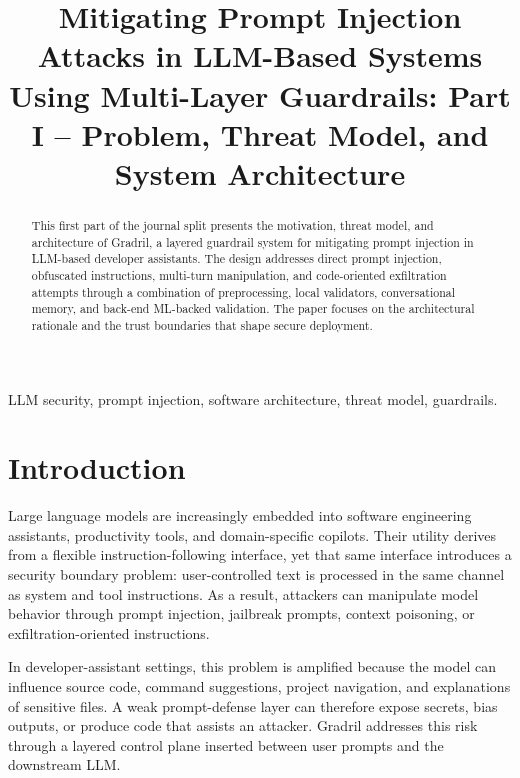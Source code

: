 \documentclass[journal]{IEEEtran}
\begin{document}
\title{Mitigating Prompt Injection Attacks in LLM-Based Systems Using Multi-Layer Guardrails: Part I -- Problem, Threat Model, and System Architecture}

\author{
}

\maketitle
\setcounter{page}{1}

\begin{abstract}
This first part of the journal split presents the motivation, threat model, and architecture of Gradril, a layered guardrail system for mitigating prompt injection in LLM-based developer assistants. The design addresses direct prompt injection, obfuscated instructions, multi-turn manipulation, and code-oriented exfiltration attempts through a combination of preprocessing, local validators, conversational memory, and back-end ML-backed validation. The paper focuses on the architectural rationale and the trust boundaries that shape secure deployment.
\end{abstract}

\begin{IEEEkeywords}
LLM security, prompt injection, software architecture, threat model, guardrails.
\end{IEEEkeywords}

\section{Introduction}
Large language models are increasingly embedded into software engineering assistants, productivity tools, and domain-specific copilots. Their utility derives from a flexible instruction-following interface, yet that same interface introduces a security boundary problem: user-controlled text is processed in the same channel as system and tool instructions. As a result, attackers can manipulate model behavior through prompt injection, jailbreak prompts, context poisoning, or exfiltration-oriented instructions.

In developer-assistant settings, this problem is amplified because the model can influence source code, command suggestions, project navigation, and explanations of sensitive files. A weak prompt-defense layer can therefore expose secrets, bias outputs, or produce code that assists an attacker. Gradril addresses this risk through a layered control plane inserted between user prompts and the downstream LLM.
\end{document}
